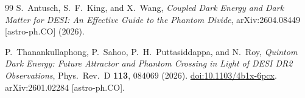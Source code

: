 \documentclass[12pt,a4paper]{article}
\theoremstyle{definition}
\theoremstyle{plain}
\theoremstyle{remark}
\begin{document}
\begin{thebibliography}{99}
S.~Antusch, S.~F.~King, and X.~Wang,
\textit{Coupled Dark Energy and Dark Matter for DESI: An Effective Guide to the Phantom Divide},
arXiv:2604.08449 [astro-ph.CO] (2026).

P.~Thanankullaphong, P.~Sahoo, P.~H.~Puttasiddappa, and N.~Roy,
\textit{Quintom Dark Energy: Future Attractor and Phantom Crossing in Light of DESI DR2 Observations},
Phys.\ Rev.\ D \textbf{113}, 084069 (2026).
\href{https://doi.org/10.1103/4b1x-6pcx}{doi:10.1103/4b1x-6pcx}.
arXiv:2601.02284 [astro-ph.CO].

\end{thebibliography}
\end{document}
